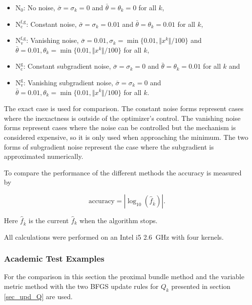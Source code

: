\begin{itemize}[label={--}]
	\item \(\text{N}_0\): No noise, \(\bar{\sigma}=\sigma_k=0\) and \(\bar{\theta}=\theta_k=0\) for all \(k\),
	\item \(\text{N}_{\text{c}}^{\text{f,g}}\): Constant noise, \(\bar{\sigma}=\sigma_k=0.01\) and \(\bar{\theta}=\theta_k=0.01\) for all \(k\),
	\item \(\text{N}_{\text{v}}^{\text{f,g}}\): Vanishing noise, \(\bar{\sigma}=0.01, \sigma_k = \min\{0.01,\Vert x^k\Vert/100\}\) and \(\bar{\theta}=0.01, \theta_k=\min\{0.01,\Vert x^k\Vert/100\}\) for all \(k\),
	\item \(\text{N}_{\text{c}}^{\text{g}}\): Constant subgradient noise, \(\bar{\sigma}=\sigma_k=0\) and \(\bar{\theta}=\theta_k=0.01\) for all \(k\) and 
	\item \(\text{N}_{\text{v}}^{\text{g}}\): Vanishing subgradient noise, \(\bar{\sigma}=\sigma_k=0\) and \(\bar{\theta}=0.01, \theta_k=\min\{0.01,\Vert x^k\Vert/100\}\) for all \(k\).
\end{itemize}

The exact case is used for comparison. The constant noise forms represent cases where the inexactness is outside of the optimizer's control. The vanishing noise forms represent cases where the noise can be controlled  but the mechanism is considered expensive, so it is only used when approaching the minimum.
The two forms of subgradient noise represent the case where the subgradient is approximated numerically.


To compare the performance of the different methods the accuracy is measured by

\[ \text{accuracy} = |\log_{10}(\hat{f}_{\bar{k}})|. \]

Here \(\hat{f}_{\bar{k}}\) is the current \(\hat{f}_k\) when the algorithm stops.

All calculations were performed on an Intel i5 2.6~GHz with four kernels.


\subsubsection{Academic Test Examples}

For the comparison in this section the proximal bundle method and the variable metric method with the two BFGS update rules for \(Q_k\) presented in section \ref{sec_upd_Q} are used. %


